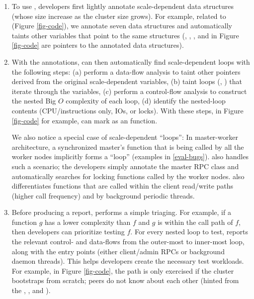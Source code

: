 \begin{enumerate}
\item {} To use \sfind,
developers first lightly annotate scale-dependent data structures (whose
size increase as the cluster size grows).
%
For example, related to \caone (Figure \ref{fig-code}), we annotate seven
data structures and \sfind automatically taints other variables that point
to the same structures (\eg, , , and
 in Figure \ref{fig-code} are pointers to the annotated data
structures).





\item {}
%
With the annotations, \sfind can then automatically find scale-dependent
loops with the following steps:
%
(a) perform a data-flow analysis to taint other pointers derived from the
original scale-dependent variables,
%
(b) taint loops (, ) that iterate through the variables,
%
(c) perform a control-flow analysis to construct the nested Big $O$
complexity of each loop,
%
(d) identify the nested-loop contents (CPU/instructions only, IOs, or
locks).
%
With these steps, in Figure \ref{fig-code} for example, \sfind can mark
 as an \oonnn function.


We also notice a special case of 
scale-dependent ``loops'': 
In master-worker architecture, a synchronized master's function
that is being called by all the worker nodes implicitly forms a ``loop''
(examples in \sec\ref{eval-bugs}).  
%
\sfind also handles such a scenario; the developers simply annotate the
master RPC class and \sfind automatically searches for locking
functions called by the worker nodes.  \sfind also differentiates
functions that are called within the client read/write paths (higher call
frequency) and by background periodic threads.

%
%

\item {}
%
Before producing a report, \sfind performs a simple triaging.  For
example, if a function $g$ has a lower complexity than $f$ and $g$ is
within the call path of $f$, then developers can prioritize testing $f$.
%
For every nested loop to test, \sfind reports the relevant control- and
data-flows from the outer-most to inner-most loop, along with the entry
points (either client/admin RPCs or background daemon threads).
%
This helps developers create the necessary test workloads.  For example,
in Figure \ref{fig-code}, the \oonnn path is only exercised if the cluster
bootstraps from scratch; peers do not know about each other (hinted from
the , ,  and
).


\end{enumerate}
